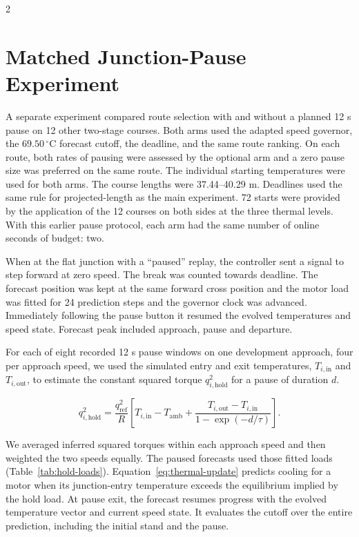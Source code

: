 \documentclass{ieeeaccess}
\begin{document}
\begin{multicols}{2}
\section{Matched Junction-Pause Experiment}
\label{app:pause}

A separate experiment compared route selection with and without a planned 12 s pause on 12 other two-stage courses. Both arms used the adapted speed governor, the $69.50\,{}^\circ\mathrm{C}$ forecast cutoff, the deadline, and the same route ranking. On each route, both rates of pausing were assessed by the optional arm and a zero pause size was preferred on the same route. The individual starting temperatures were used for both arms. The course lengths were 37.44--40.29 m. Deadlines used the same rule for projected-length as the main experiment. 72 starts were provided by the application of the 12 courses on both sides at the three thermal levels. With this earlier pause protocol, each arm had the same number of online seconds of budget: two.

When at the flat junction with a ``paused'' replay, the controller sent a signal to step forward at zero speed. The break was counted towards deadline. The forecast position was kept at the same forward cross position and the motor load was fitted for 24 prediction steps and the governor clock was advanced. Immediately following the pause button it resumed the evolved temperatures and speed state. Forecast peak included approach, pause and departure.

For each of eight recorded 12 s pause windows on one development approach, four per approach speed, we used the simulated entry and exit temperatures, $T_{i,\mathrm{in}}$ and $T_{i,\mathrm{out}}$, to estimate the constant squared torque $q_{i,\mathrm{hold}}^2$ for a pause of duration $d$.

\begin{equation}
q_{i,\mathrm{hold}}^2 =
\frac{q_{\mathrm{ref}}^2}{R}
\left[T_{i,\mathrm{in}}-T_{\mathrm{amb}}+
\frac{T_{i,\mathrm{out}}-T_{i,\mathrm{in}}}{1-\exp(-d/\tau)}\right].
\end{equation}

We averaged inferred squared torques within each approach speed and then weighted the two speeds equally. The paused forecasts used those fitted loads (Table~\ref{tab:hold-loads}). Equation~\eqref{eq:thermal-update} predicts cooling for a motor when its junction-entry temperature exceeds the equilibrium implied by the hold load. At pause exit, the forecast resumes progress with the evolved temperature vector and current speed state. It evaluates the cutoff over the entire prediction, including the initial stand and the pause.


\end{multicols}
\end{document}
